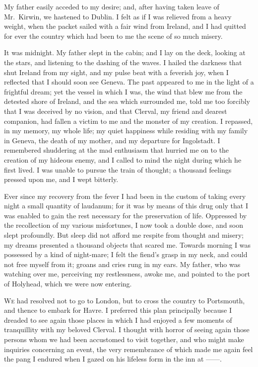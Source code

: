 My father easily acceded to my desire;
and, after having taken leave of
Mr.~Kirwin, we hastened to Dublin. I
felt as if I was relieved from a heavy
weight, when the packet sailed with a
fair wind from Ireland, and I had
quitted for ever the country which had
been to me the scene of so much
misery.

It was midnight. My father slept in
the cabin; and I lay on the deck, looking
at the stars, and listening to the
dashing of the waves. I hailed the
darkness that shut Ireland from my
sight, and my pulse beat with a feverish
joy, when I reflected that I should soon
see Geneva. The past appeared to
me in the light of a frightful dream;
yet the vessel in which I was, the wind
that blew me from the detested shore of
Ireland, and the sea which surrounded
me, told me too forcibly that I was deceived
by no vision, and that Clerval,
my friend and dearest companion, had
fallen a victim to me and the monster
of my creation. I repassed, in my
memory, my whole life; my quiet happiness
while residing with my family in
Geneva, the death of my mother, and
my departure for Ingolstadt. I remembered
shuddering at the mad enthusiasm
that hurried me on to the creation
of my hideous enemy, and I called
to mind the night during which he first
lived. I was unable to pursue the train
of thought; a thousand feelings pressed
upon me, and I wept bitterly.

Ever since my recovery from the fever
I had been in the custom of taking every
night a small quantity of laudanum;
for it was by means of this drug only
that I was enabled to gain the rest
necessary for the preservation of life.
Oppressed by the recollection of my
various misfortunes, I now took a
double dose, and soon slept profoundly.
But sleep did not afford me respite
from thought and misery; my dreams
presented a thousand objects that scared
me. Towards morning I was possessed
by a kind of night-mare; I felt the
fiend's grasp in my neck, and could not
free myself from it; groans and cries
rung in my ears. My father, who was
watching over me, perceiving my restlessness,
awoke me, and pointed to the
port of Holyhead, which we were now
entering.


\textsc{We} had resolved not to go to London,
but to cross the country to Portsmouth,
and thence to embark for Havre. I
preferred this plan principally because
I dreaded to see again those places in
which I had enjoyed a few moments of
tranquillity with my beloved Clerval.
I thought with horror of seeing again
those persons whom we had been accustomed
to visit together, and who
might make inquiries concerning an
event, the very remembrance of which
made me again feel the pang I endured
when I gazed on his lifeless form in
the inn at ------.

